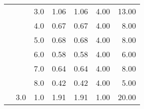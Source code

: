 \begin{tabular}{lllrrrr}
       &     & 3.0  &       1.06 &      1.06 & 4.00 &  13.00 \\
       &     & 4.0  &       0.67 &      0.67 & 4.00 &   8.00 \\
       &     & 5.0  &       0.68 &      0.68 & 4.00 &   8.00 \\
       &     & 6.0  &       0.58 &      0.58 & 4.00 &   6.00 \\
       &     & 7.0  &       0.64 &      0.64 & 4.00 &   8.00 \\
       &     & 8.0  &       0.42 &      0.42 & 4.00 &   5.00 \\
       & 3.0 & 1.0  &       1.91 &      1.91 & 1.00 &  20.00 \\
\bottomrule
\end{tabular}
